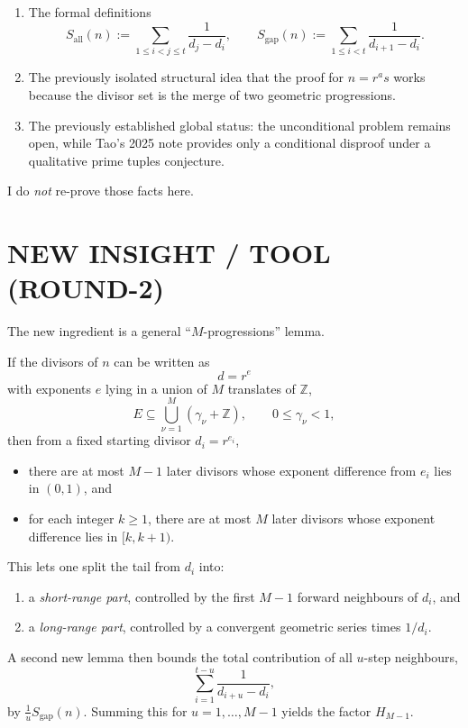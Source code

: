 \begin{enumerate}
\item The formal definitions
\[
S_{\mathrm{all}}(n):=\sum_{1\le i<j\le t}\frac{1}{d_j-d_i},
\qquad
S_{\mathrm{gap}}(n):=\sum_{1\le i<t}\frac{1}{d_{i+1}-d_i}.
\]
\item The previously isolated structural idea that the proof for \(n=r^a s\) works because the divisor set is the merge of two geometric progressions.
\item The previously established global status: the unconditional problem remains open, while Tao's 2025 note provides only a conditional disproof under a qualitative prime tuples conjecture.
\end{enumerate}

I do \emph{not} re-prove those facts here.

\section{NEW INSIGHT / TOOL (ROUND-2)}

The new ingredient is a general ``\(M\)-progressions'' lemma.

If the divisors of \(n\) can be written as
\[
d=r^e
\]
with exponents \(e\) lying in a union of \(M\) translates of \(\mathbb Z\),
\[
E\subseteq \bigcup_{\nu=1}^{M} (\gamma_\nu+\mathbb Z),
\qquad 0\leq \gamma_\nu<1,
\]
then from a fixed starting divisor \(d_i=r^{e_i}\),

\begin{itemize}
\item there are at most \(M-1\) later divisors whose exponent difference from \(e_i\) lies in \((0,1)\), and
\item for each integer \(k\geq 1\), there are at most \(M\) later divisors whose exponent difference lies in \([k,k+1)\).
\end{itemize}

This lets one split the tail from \(d_i\) into:

\begin{enumerate}
\item a \emph{short-range part}, controlled by the first \(M-1\) forward neighbours of \(d_i\), and
\item a \emph{long-range part}, controlled by a convergent geometric series times \(1/d_i\).
\end{enumerate}

A second new lemma then bounds the total contribution of all \(u\)-step neighbours,
\[
\sum_{i=1}^{t-u}\frac{1}{d_{i+u}-d_i},
\]
by \(\frac1u S_{\mathrm{gap}}(n)\). Summing this for \(u=1,\dots,M-1\) yields the factor \(H_{M-1}\).


